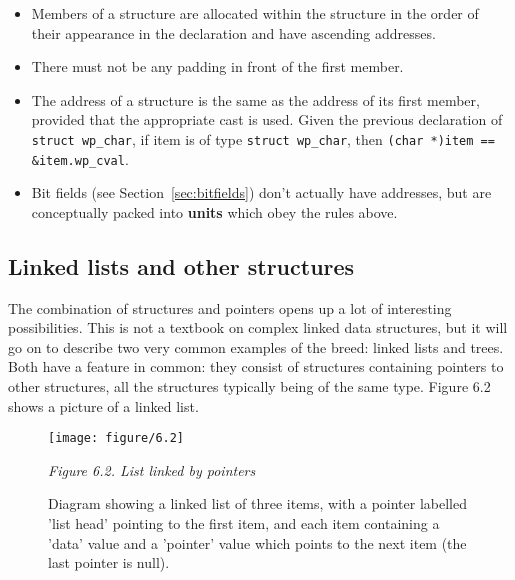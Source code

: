    \begin{itemize}
    \item Members of a structure are allocated within the structure in the
     order of their appearance in the declaration and have ascending
     addresses.

    \item There must not be any padding in front of the first member.

    \item The address of a structure is the same as the address of its first
     member, provided that the appropriate cast is used. Given the
     previous declaration of \texttt{struct wp\_char}, if item is of type
     \texttt{struct wp\_char}, then
     \texttt{(char *)item == \&item.wp\_cval}.

    \item Bit fields (see Section~\ref{sec:bitfields}) don't actually have
     addresses, but are conceptually packed into \textbf{units} which obey
     the rules above.
   \end{itemize}

  

  \subsection{Linked lists and other structures}
   

   The combination of structures and pointers opens up a lot of interesting
    possibilities. This is not a textbook on complex linked data structures,
    but it will go on to describe two very common examples of the breed: linked
    lists and trees. Both have a feature in common: they consist of structures
    containing pointers to other structures, all the structures typically being
    of the same type. Figure 6.2 shows a picture of a linked
    list.


    \begin{figure*}[htb]\centering
      \texttt{[image: figure/6.2]}
      \caption{Diagram showing a linked list of three items,
        with a pointer  labelled 'list head' pointing to the first item,
        and each item containing a 'data' value and a 'pointer' value
        which points to the next item (the last pointer is null).}
\begin{center}\textit{Figure 6.2. List linked by pointers}\end{center}
    \end{figure*}



